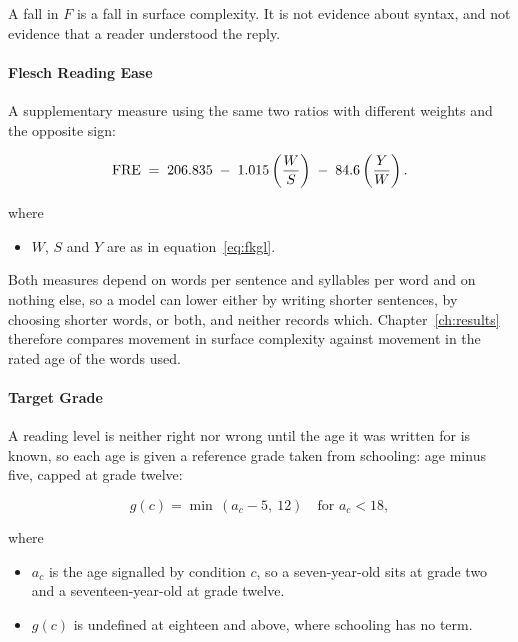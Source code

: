 A fall in $F$ is a fall in surface complexity. It is not evidence about syntax,
and not evidence that a reader understood the reply.

\paragraph{Flesch Reading Ease} A supplementary measure using the same two ratios
with different weights and the opposite sign:

\begin{equation}
\label{eq:fre}
\mathrm{FRE} \;=\; 206.835 \;-\; 1.015 \left( \frac{W}{S} \right)
        \;-\; 84.6 \left( \frac{Y}{W} \right) .
\end{equation}

where

\begin{itemize}[itemsep=1pt]
  \item $W$, $S$ and $Y$ are as in equation~\eqref{eq:fkgl}.
\end{itemize}

Both measures depend on words per sentence and syllables per word and on nothing
else, so a model can lower either by writing shorter sentences, by choosing
shorter words, or both, and neither records which. Chapter~\ref{ch:results}
therefore compares movement in surface complexity against movement in the rated
age of the words used.

\paragraph{Target Grade} A reading level is neither right nor wrong until the age
it was written for is known, so each age is given a reference grade taken from
schooling: age minus five, capped at grade twelve:

\begin{equation}
\label{eq:target}
g(c) = \min\,(a_c - 5,\ 12) \quad\text{for } a_c < 18 ,
\end{equation}

where

\begin{itemize}[itemsep=1pt]
  \item $a_c$ is the age signalled by condition $c$, so a seven-year-old sits at
    grade two and a seventeen-year-old at grade twelve.
  \item $g(c)$ is undefined at eighteen and above, where schooling has no term.
\end{itemize}

